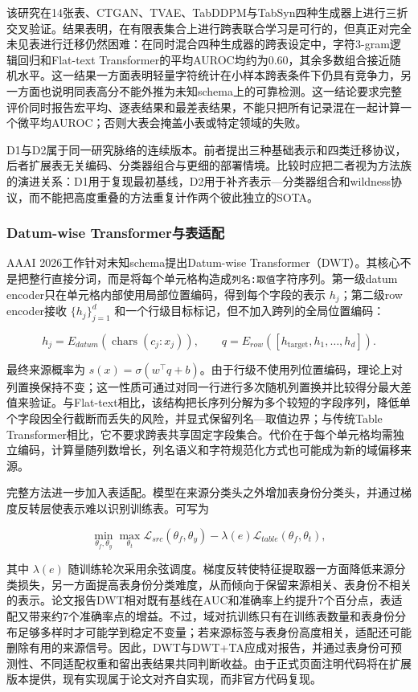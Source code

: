 \documentclass[
  chinese,
  12pt,
  a4paper,
  chinese,
  UTF8]{ctexart}
\begin{document}
该研究在14张表、CTGAN、TVAE、TabDDPM与TabSyn四种生成器上进行三折交叉验证。结果表明，在有限表集合上进行跨表联合学习是可行的，但真正对完全未见表进行迁移仍然困难：在同时混合四种生成器的跨表设定中，字符3-gram逻辑回归和Flat-text
Transformer的平均AUROC均约为0.60，其余多数组合接近随机水平\autocite{kindji2025wild}。这一结果一方面表明轻量字符统计在小样本跨表条件下仍具有竞争力，另一方面也说明同表高分不能外推为未知schema上的可靠检测。这一结论要求完整评价同时报告宏平均、逐表结果和最差表结果，不能只把所有记录混在一起计算一个微平均AUROC；否则大表会掩盖小表或特定领域的失败。

D1与D2属于同一研究脉络的连续版本。前者提出三种基础表示和四类迁移协议，后者扩展表无关编码、分类器组合与更细的部署情境。比较时应把二者视为方法族的演进关系：D1用于复现最初基线，D2用于补齐表示---分类器组合和wildness协议，而不能把高度重叠的方法重复计作两个彼此独立的SOTA。

\subsubsection{Datum-wise
Transformer与表适配}\label{datum-wise-transformerux4e0eux8868ux9002ux914d}

AAAI 2026工作针对未知schema提出Datum-wise
Transformer（DWT）\autocite{kindji2026robust}。其核心不是把整行直接分词，而是将每个单元格构造成\texttt{列名:取值}字符序列。第一级datum
encoder只在单元格内部使用局部位置编码，得到每个字段的表示
\(h_j\)；第二级row encoder接收 \(\{h_j\}_{j=1}^{d}\)
和一个行级目标标记，但不加入跨列的全局位置编码：

\[h_j=E_{datum}(\operatorname{chars}(c_j:x_j)),\qquad
q=E_{row}([h_{\mathrm{target}},h_1,\ldots,h_d]).\]

最终来源概率为
\(s(x)=\sigma(w^\top q+b)\)。由于行级不使用列位置编码，理论上对列置换保持不变；这一性质可通过对同一行进行多次随机列置换并比较得分最大差值来验证。与Flat-text相比，该结构把长序列分解为多个较短的字段序列，降低单个字段因全行截断而丢失的风险，并显式保留列名---取值边界；与传统Table
Transformer相比，它不要求跨表共享固定字段集合。代价在于每个单元格均需独立编码，计算量随列数增长，列名语义和字符规范化方式也可能成为新的域偏移来源。

完整方法进一步加入表适配。模型在来源分类头之外增加表身份分类头，并通过梯度反转层使表示难以识别训练表。可写为

\[\min_{\theta_f,\theta_y}\max_{\theta_t}
\mathcal L_{src}(\theta_f,\theta_y)-\lambda(e)\mathcal L_{table}(\theta_f,\theta_t),\]

其中 \(\lambda(e)\)
随训练轮次采用余弦调度。梯度反转使特征提取器一方面降低来源分类损失，另一方面提高表身份分类难度，从而倾向于保留来源相关、表身份不相关的表示。论文报告DWT相对既有基线在AUC和准确率上约提升7个百分点，表适配又带来约7个准确率点的增益\autocite{kindji2026robust}。不过，域对抗训练只有在训练表数量和表身份分布足够多样时才可能学到稳定不变量；若来源标签与表身份高度相关，适配还可能删除有用的来源信号。因此，DWT与DWT+TA应成对报告，并通过表身份可预测性、不同适配权重和留出表结果共同判断收益。由于正式页面注明代码将在扩展版本提供，现有实现属于论文对齐自实现，而非官方代码复现。
\end{document}
